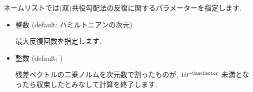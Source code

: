 \documentclass[letterpaper,10pt,dvipdfmx,openany]{sphinxmanual}
\begin{document}
ネームリストでは(双)共役勾配法の反復に関するパラメーターを指定します.
\begin{itemize}
\item {} 

 整数 (default: ハミルトニアンの次元)

 最大反復回数を指定します.

\item {} 

 整数 (default: )

 残差ベクトルの二乗ノルムを次元数で割ったものが,
\(10^{-{\tt Convfactor}}\) 未満となったら収束したとみなして計算を終了します.

\end{itemize}
\end{document}
